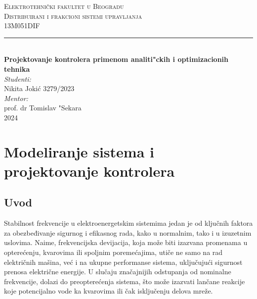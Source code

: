 \documentclass[a4paper,11pt]{article}
\theoremstyle{definition} \newtheorem{deff}{Definicija}[section]
\theoremstyle{definition} \newtheorem{prim}[deff]{Primer}
\theoremstyle{plain} \newtheorem{teor}[deff]{Teorema}
\begin{document}
	
	\begin{titlepage}
		
		\newcommand{\HRule}{\rule{\linewidth}{0.5mm}} 							%
		\center 
		
		\textsc{\LARGE Elektrotehnički fakultet u Beogradu}\\[1cm]
		
		\textsc{\Large Distribuirani i frakcioni sistemi upravljanja}\\[0.2cm]
		\textsc{\large 13M051DIF}\\[1cm] 										
		\HRule \\[0.8cm]
		{ \huge \bfseries Projektovanje kontrolera primenom analiti"ckih i optimizacionih tehnika }\\[0.7cm]								%
		
		
		\large
		\vfill 
		\emph{Studenti:}\\
		Nikita Jokić 3279/2023\\[0.1cm]
		\emph{Mentor:}\\
		prof. dr Tomislav "Sekara\\[0.1cm]									
		{\large 2024}\\[2cm]
	\end{titlepage}
	\tableofcontents
	\newpage
	
	\section{Modeliranje sistema i projektovanje kontrolera}\label{sec:mod i projektovanje}
	\subsection{Uvod} 
	
	Stabilnost frekvencije u elektroenergetskim sistemima jedan je od ključnih faktora za obezbeđivanje sigurnog i efikasnog rada, kako u normalnim, tako i u izuzetnim uslovima. Naime, frekvencijska devijacija, koja može biti izazvana promenama u opterećenju, kvarovima ili spoljnim poremećajima, utiče ne samo na rad električnih mašina, već i na ukupne performanse sistema, uključujući sigurnost prenosa električne energije. U slučaju značajnijih odstupanja od nominalne frekvencije, dolazi do preopterećenja sistema, što može izazvati lančane reakcije koje potencijalno vode ka kvarovima ili čak isključenju delova mreže. \\
	
\end{document}
